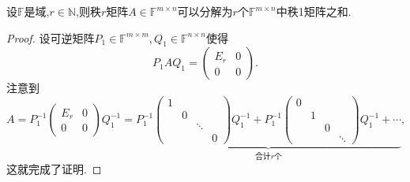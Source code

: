 \documentclass[../../main.tex]{subfiles}
\begin{document}
\begin{theorem}[秩一分解]\label{theorem:秩一分解}
设\( \mathbb{F} \)是域,\( r \in \mathbb{N} \),则秩\( r \)矩阵\( A \in \mathbb{F}^{m \times n} \)可以分解为\( r \)个\( \mathbb{F}^{m \times n} \)中秩1矩阵之和.
\end{theorem}
\begin{proof}
设可逆矩阵\( P_1 \in \mathbb{F}^{m \times m}, Q_1 \in \mathbb{F}^{n \times n} \)使得
\[
P_1 A Q_1 = \begin{pmatrix} E_r & 0 \\ 0 & 0 \end{pmatrix}.
\]
注意到
\[
A = P_1^{-1} \begin{pmatrix} E_r & 0 \\ 0 & 0 \end{pmatrix} Q_1^{-1} = \underbrace{P_1^{-1} \begin{pmatrix} 1 & & \\ & 0 & \\ & & \ddots \\ & & & 0 \end{pmatrix} Q_1^{-1} + P_1^{-1} \begin{pmatrix} 0 & & \\ & 1 & \\ & & 0 \\ & & & \ddots \end{pmatrix} Q_1^{-1} + \cdots}_{\text{合计} r \text{个}},
\]
这就完成了证明.

\end{proof}
\end{document}
